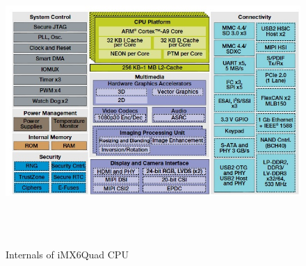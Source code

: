 \begin{figure}[h!]
	\centering
	\includegraphics[width=160mm, height=110mm]{figures/imx6q}
	\caption{Internals of iMX6Quad CPU \cite{imx_spec}}
	\label{fig:app:imx6q}
\end{figure}

\cleardoublepage
